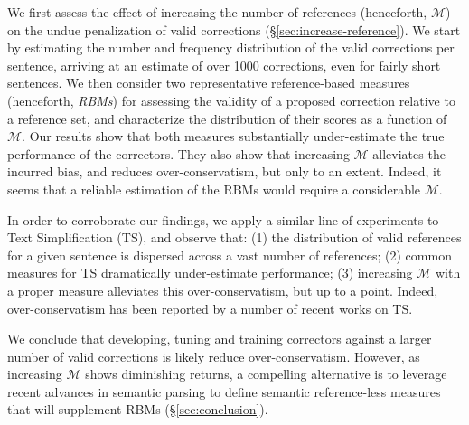 \documentclass[letterpaper, 11pt]{article}
\begin{document}
We first assess the effect of increasing the number of references (henceforth, $\mathcal{M}$) on 
the undue penalization of valid corrections (\S \ref{sec:increase-reference}).
We start by estimating the number and frequency distribution of the valid corrections per sentence, arriving 
at an estimate of over 1000 corrections, even for fairly short sentences.
We then consider two representative reference-based measures (henceforth, {\it RBMs}) for
assessing the validity of a proposed correction relative to a reference set, 
and characterize the distribution of their scores as a function of $\mathcal{M}$. 
Our results show that both measures substantially under-estimate the true performance of
the correctors. They also show that increasing $\mathcal{M}$ alleviates the incurred bias, 
and reduces over-conservatism, but only to an extent. 
Indeed, it seems that a reliable estimation of the RBMs would require a considerable $\mathcal{M}$.

In order to corroborate our findings, we apply a 
similar line of experiments to Text Simplification (TS),
and observe that: (1) the distribution of valid references for a given sentence is dispersed across a vast number of references; 
(2) common measures for TS dramatically under-estimate performance; 
(3) increasing $\mathcal{M}$ with a proper measure alleviates this over-conservatism, but up to a point.
Indeed, over-conservatism has been reported by a number of recent works on TS.%

We conclude that developing, tuning and training correctors against a larger number of valid corrections is likely reduce over-conservatism.
However, as increasing $\mathcal{M}$ shows diminishing returns, a compelling alternative is to leverage recent advances in semantic parsing to define semantic reference-less measures that will supplement RBMs (\S\ref{sec:conclusion}). 


\end{document}
